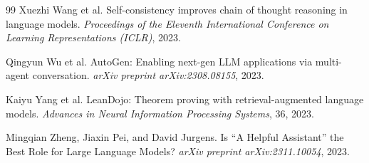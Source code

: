 \documentclass[11pt]{article}
\begin{document}
\begin{thebibliography}{99}
Xuezhi Wang et al.
\newblock Self-consistency improves chain of thought reasoning in language models.
\newblock \emph{Proceedings of the Eleventh International Conference on Learning Representations (ICLR)}, 2023.

Qingyun Wu et al.
\newblock AutoGen: Enabling next-gen LLM applications via multi-agent conversation.
\newblock \emph{arXiv preprint arXiv:2308.08155}, 2023.

Kaiyu Yang et al.
\newblock LeanDojo: Theorem proving with retrieval-augmented language models.
\newblock \emph{Advances in Neural Information Processing Systems}, 36, 2023.

Mingqian Zheng, Jiaxin Pei, and David Jurgens.
\newblock Is ``A Helpful Assistant'' the Best Role for Large Language Models?
\newblock \emph{arXiv preprint arXiv:2311.10054}, 2023.

\end{thebibliography}
\end{document}
